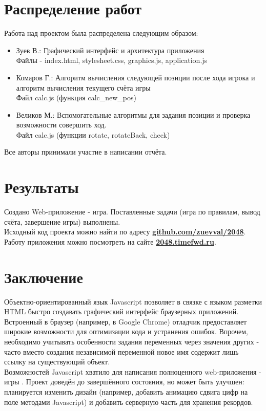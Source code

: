 \documentclass[a4paper,12pt]{article}
\newcommand{\lk}{\guillemotleft}
\newcommand{\rk}{\guillemotright}
\begin{document}
\section{Распределение работ}
Работа над проектом была распределена следующим образом:
\begin{itemize}
\item{Зуев В.:} Графический интерфейс и архитектура приложения\\
Файлы - index.html, stylesheet.css, graphics.js, application.js
\item{Комаров Г.:} Алгоритм вычисления следующей позиции после хода игрока и алгоритм вычисления текущего счёта игры\\
Файл calc.js (функция calc\_new\_pos)
\item{Великов М.:} Вспомогательные алгоритмы для задания позиции и проверка возможности совершить ход.\\
Файл calc.js (функции rotate, rotateBack, check)
\end{itemize}
Все авторы принимали участие в написании отчёта.
\section{Результаты}
Создано Web-приложение - игра. Поставленные задачи (игра по правилам, вывод счёта, завершение игры) выполнены.\\
Исходный код проекта можно найти по адресу \textbf{\href{https://github.com/zuevval/2048}{github.com/zuevval/2048}}.\\
Работу приложения можно посмотреть на сайте \textbf{\href{http://2048.timefwd.ru}{2048.timefwd.ru}}.
\section{Заключение}
Объектно-ориентированный язык Javascript позволяет в связке с языком разметки HTML быстро создавать графический интерфейс браузерных приложений. Встроенный в браузер (например, в  Google Chrome) отладчик предоставляет широкие возможности для оптимизации кода и устранения ошибок. Впрочем, необходимо учитывать особенности задания переменных через значения других - часто вместо создания независимой переменной новое имя содержит лишь ссылку на существующий объект.\\
Возможностей Javascript хватило для написания полноценного web-\-при\-ло\-жения - игры \lk2048\rk. Проект доведён до завершённого состояния, но может быть улучшен: планируется изменить дизайн (например, добавить анимацию сдвига цифр на поле методами Javascript) и добавить серверную часть для хранения рекордов.
\end{document}
